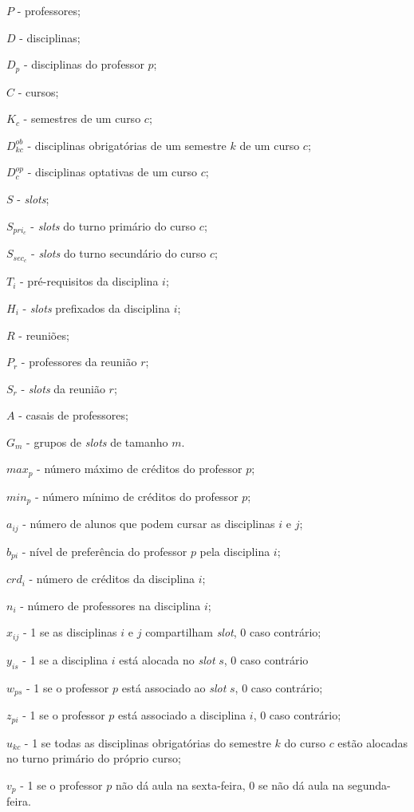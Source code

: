 \begin{alineascomponto}
    \item $P$ - professores;
    \item $D$ - disciplinas;
    \item $D_p$ - disciplinas do professor $p$;
    \item $C$ - cursos;
    \item $K_c$ - semestres de um curso $c$;
    \item $D_{kc}^{ob}$ - disciplinas obrigatórias de um semestre $k$ de um curso $c$;
    \item $D_{c}^{op}$ - disciplinas optativas de um curso $c$;
	\item $S$ - \textit{slots};
	\item $S_{pri_c}$ - \textit{slots} do turno primário do curso $c$;
	\item $S_{sec_c}$ - \textit{slots} do turno secundário do curso $c$;
	\item $T_i$ - pré-requisitos da disciplina $i$;
	\item $H_i$ - \textit{slots} prefixados da disciplina $i$;
	\item $R$ - reuniões;
	\item $P_r$ - professores da reunião $r$;
	\item $S_r$ - \textit{slots} da reunião $r$;
	\item $A$ - casais de professores;
	\item $G_m$ - grupos de \textit{slots} de tamanho $m$.
	\item $max_p$ - número máximo de créditos do professor $p$;
    \item $min_p$ - número mínimo de créditos do professor $p$;
	\item $a_{ij}$ - número de alunos que podem cursar as disciplinas $i$ e $j$;
	\item $b_{pi}$ - nível de preferência do professor $p$ pela disciplina $i$;	
	\item $crd_i$ - número de créditos da disciplina $i$;
	\item $n_i$ - número de professores na disciplina $i$;
    \item $x_{ij}$ - 1 se as disciplinas  $i$ e $j$ compartilham \textit{slot}, 0 caso contrário;
	\item $y_{is}$ - 1 se a disciplina $i$ está alocada no \textit{slot} $s$, 0 caso contrário
	\item $w_{ps}$ - 1 se o professor $p$ está associado ao \textit{slot} $s$, 0 caso contrário;
	\item $z_{pi}$ - 1 se o professor $p$ está associado a disciplina $i$, 0 caso contrário;
	\item $u_{kc}$ - 1 se todas as disciplinas obrigatórias do semestre $k$ do curso $c$ estão alocadas no turno primário do próprio curso;
	\item $v_p$ - 1 se o professor $p$ não dá aula na sexta-feira, 0 se não dá aula na segunda-feira.
\end{alineascomponto} 

